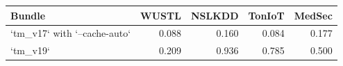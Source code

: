 \begin{tabular}{lrrrr}
\toprule
Bundle & WUSTL & NSLKDD & TonIoT & MedSec \\
\midrule
`tm\_v17` with `--cache-auto` & 0.088 & 0.160 & 0.084 & 0.177 \\
`tm\_v19` & 0.209 & 0.936 & 0.785 & 0.500 \\
\bottomrule
\end{tabular}
